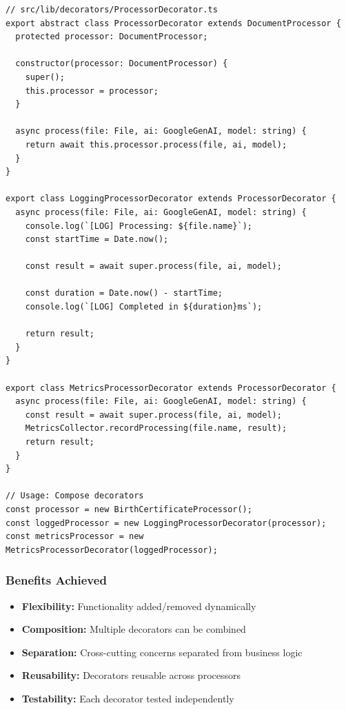 \documentclass[11pt, a4paper]{article}
\theoremstyle{plain}
\theoremstyle{definition}
\begin{document}
\begin{lstlisting}[caption={Decorator Pattern Implementation}]
// src/lib/decorators/ProcessorDecorator.ts
export abstract class ProcessorDecorator extends DocumentProcessor {
  protected processor: DocumentProcessor;
  
  constructor(processor: DocumentProcessor) {
    super();
    this.processor = processor;
  }
  
  async process(file: File, ai: GoogleGenAI, model: string) {
    return await this.processor.process(file, ai, model);
  }
}

export class LoggingProcessorDecorator extends ProcessorDecorator {
  async process(file: File, ai: GoogleGenAI, model: string) {
    console.log(`[LOG] Processing: ${file.name}`);
    const startTime = Date.now();
    
    const result = await super.process(file, ai, model);
    
    const duration = Date.now() - startTime;
    console.log(`[LOG] Completed in ${duration}ms`);
    
    return result;
  }
}

export class MetricsProcessorDecorator extends ProcessorDecorator {
  async process(file: File, ai: GoogleGenAI, model: string) {
    const result = await super.process(file, ai, model);
    MetricsCollector.recordProcessing(file.name, result);
    return result;
  }
}

// Usage: Compose decorators
const processor = new BirthCertificateProcessor();
const loggedProcessor = new LoggingProcessorDecorator(processor);
const metricsProcessor = new MetricsProcessorDecorator(loggedProcessor);
\end{lstlisting}

\subsubsection{Benefits Achieved}

\begin{itemize}
    \item \textbf{Flexibility:} Functionality added/removed dynamically
    \item \textbf{Composition:} Multiple decorators can be combined
    \item \textbf{Separation:} Cross-cutting concerns separated from business logic
    \item \textbf{Reusability:} Decorators reusable across processors
    \item \textbf{Testability:} Each decorator tested independently
\end{itemize}
\end{document}
